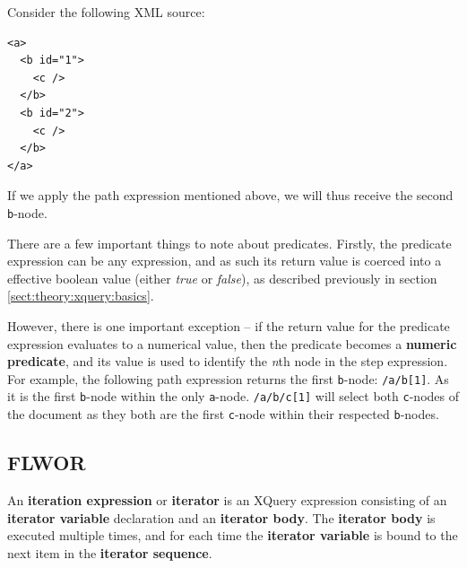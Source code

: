 Consider the following XML source:
\begin{center}
\begin{minipage}[h]{3.2cm}
\begin{verbatim}
<a>
  <b id="1">
    <c />
  </b>
  <b id="2">
    <c />
  </b>
</a>
\end{verbatim}
\end{minipage}
\end{center}
If we apply the path expression mentioned above, we will thus receive the second
\verb!b!-node.

There are a few important things to note about predicates. Firstly, the
predicate expression can be any expression, and as such its return value is
coerced into a effective boolean value (either \textit{true} or \textit{false}), as
described previously in section \ref{sect:theory:xquery:basics}.

However, there is one important exception -- if the return value for the
predicate expression evaluates to a numerical value, then the predicate
becomes a \textbf{numeric predicate}, and its value is used to identify the
\textit{n}th node in the step expression. For example, the following path
expression returns the first \verb!b!-node: \verb!/a/b[1]!. As it is the first \verb!b!-node within the only
\verb!a!-node. \texttt{/a/b/c[1]} will select both \verb!c!-nodes of the document as they both are the first
\texttt{c}-node within their respected \texttt{b}-nodes.

\subsection{FLWOR}
\label{sect:theory:xquery:Flwor}

\begin{myDefinition}
\label{definition:iteration_expression}
An \textbf{iteration expression} or \textbf{iterator} is an XQuery expression consisting of an \textbf{iterator
variable} declaration and an \textbf{iterator body}. The \textbf{iterator body} is executed multiple times, and
for each time the \textbf{iterator variable} is bound to the next item in the \textbf{iterator sequence}.
\end{myDefinition}

